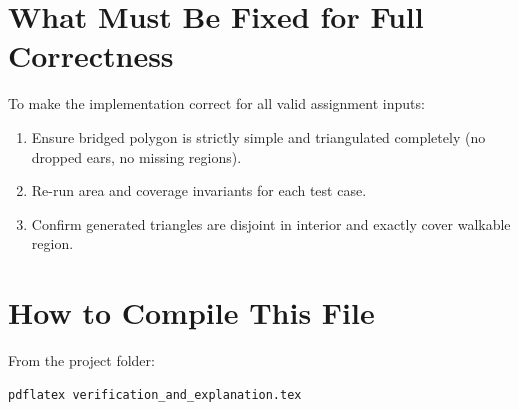 \documentclass[11pt]{article}
\begin{document}
\section{What Must Be Fixed for Full Correctness}
To make the implementation correct for all valid assignment inputs:
\begin{enumerate}
  \item Ensure bridged polygon is strictly simple and triangulated completely (no dropped ears, no missing regions).
  \item Re-run area and coverage invariants for each test case.
  \item Confirm generated triangles are disjoint in interior and exactly cover walkable region.
\end{enumerate}

\section{How to Compile This File}
From the project folder:
\begin{verbatim}
pdflatex verification_and_explanation.tex
\end{verbatim}
\end{document}
